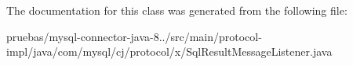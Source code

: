 The documentation for this class was generated from the following file\+:\begin{DoxyCompactItemize}
\item 
pruebas/mysql-\/connector-\/java-\/8../src/main/protocol-\/impl/java/com/mysql/cj/protocol/x/Sql\+Result\+Message\+Listener.\+java\end{DoxyCompactItemize}
